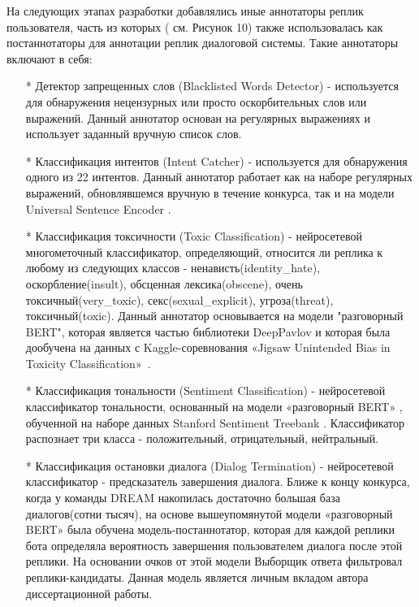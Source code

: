 На следующих этапах разработки добавлялись иные аннотаторы реплик пользователя, часть из которых ( см. Рисунок 10) также использовалась как постаннотаторы для аннотации реплик диалоговой системы. Такие аннотаторы включают в себя:
\begin{itemize}
\item[*] Детектор запрещенных слов (Blacklisted Words Detector) - используется для обнаружения нецензурных или просто оскорбительных слов или выражений. Данный аннотатор основан на регулярных выражениях и использует заданный вручную список слов.

\item[*] Классификация интентов (Intent Catcher) - используется для обнаружения одного из 22 интентов. Данный аннотатор работает как на наборе регулярных выражений, обновлявшемся вручную в течение конкурса, так и на модели Universal Sentence Encoder \cite{cer_2018}.

\item[*] Классификация токсичности (Toxic Classification) - нейросетевой многометочный классификатор, определяющий, относится ли реплика к любому из следующих классов - ненависть(identity\_hate), оскорбление(insult), обсценная лексика(obscene), очень токсичный(very\_toxic), секс(sexual\_explicit), угроза(threat), токсичный(toxic). Данный аннотатор основывается на модели "разговорный BERT"\cite{dp_conv_bert}, которая является частью библиотеки DeepPavlov и которая была дообучена на данных с Kaggle-соревнования «Jigsaw Unintended Bias in Toxicity Classification»~\cite{toxic_kaggle}.

\item[*] Классификация тональности (Sentiment Classification) - нейросетевой классификатор тональности, основанный на модели «разговорный BERT» \cite{na_website_ndn}, обученной на наборе данных Stanford Sentiment Treebank \cite{sst}. Классификатор распознает три класса - положительный, отрицательный, нейтральный.

\item[*] Классификация остановки диалога (Dialog Termination) - нейросетевой классификатор - предсказатель завершения диалога. Ближе к концу конкурса, когда у команды {DREAM} накопилась достаточно большая база диалогов(сотни тысяч), на основе вышеупомянутой модели «разговорный BERT» была обучена модель-постаннотатор, которая для каждой реплики бота определяла вероятность завершения пользователем диалога после этой реплики. На основании очков от этой модели Выборщик ответа фильтровал реплики-кандидаты. Данная модель является личным вкладом автора диссертационной работы.


\end{itemize}
